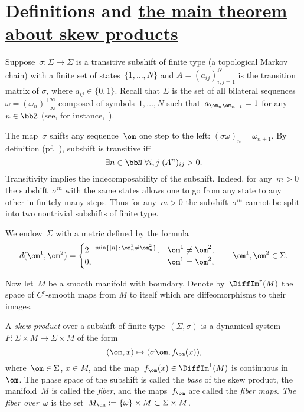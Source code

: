 \documentclass[a4paper,12pt]{amsart}
\begin{document}
\section{Definitions and \hyperref[t:markov_classification]{the main theorem about  skew products}}\label{s:markov_def}

Suppose~$\sigma \colon \Sigma \to \Sigma$ is a transitive subshift of finite type (a topological Markov chain) with a finite set of states~$\{1, \ldots, N\}$ and $A = (a_{ij})_{i,j=1}^{N}$ is the transition matrix of $\sigma$, where $a_{ij} \in \{0,1\}$. Recall that $\Sigma$ is the set of all bilateral sequences~$\omega = (\omega_n)_{-\infty}^{+\infty}$ composed of symbols~$1,\ldots,N$ such that~$a_{\om_n \om_{n+1}} = 1$ for any~$n\in\bbZ$ (see, for instance,~\cite{Katok1995}).

The map~$\sigma$ shifts any sequence~$\om$ one step to the left: $(\sigma\omega)_n = \omega_{n+1}$.
By definition (pf.~\cite{Katok1995}), subshift is transitive iff
$$
\exists n \in \bbN \; \forall i,j \; (A^n)_{ij} > 0.
$$
Transitivity implies the indecomposability of the subshift. Indeed, for any~$m > 0$ the subshift~$\sigma^m$ with the same states allows one to go from any state to any other in finitely many steps. Thus for any~$m > 0$ the subshift~$\sigma^m$ cannot be split into two nontrivial subshifts of finite type.

We endow~$\Sigma$ with a metric defined by the formula
\begin{equation}    \label{e:markov_metric}
d (\om^1, \om^2) = \begin{cases}
2^{-\min\{|n| \, : \, \om_n^1\neq \om_n^2 \}}, &  \om^1 \neq \om^2, \\
0, &   \om^1 = \om^2,
\end{cases}
\qquad \om^1,\om^2 \in \Sigma.
\end{equation}

Now let~$M$ be a smooth manifold with boundary. Denote by~$\DiffIm^r(M)$ the space of $C^r$-smooth maps from $M$ to itself which are diffeomorphisms to their images.

\begin{Def} \label{d:skpr}
A \emph{skew product} over a subshift of finite type~$(\Sigma, \sigma)$ is a dynamical system~$F \colon \Sigma \times M \to \Sigma \times M$ of the form
$$
(\om, x) \mapsto (\sigma \om, f_{\om} (x)),
$$
where~$\om\in\Sigma$, $x\in M$, and the map~$f_{\om}(x) \in \DiffIm^1(M)$ is continuous in~$\om$. The phase space of the subshift is called the \emph{base} of the skew product, the manifold~$M$ is called the \emph{fiber}, and the maps~$f_{\om}$ are called the \emph{fiber maps}. \emph{The fiber over~$\omega$} is the set~$M_\om := \{\omega\} \times M \subset \Sigma\times M$.
\end{Def}
\end{document}

